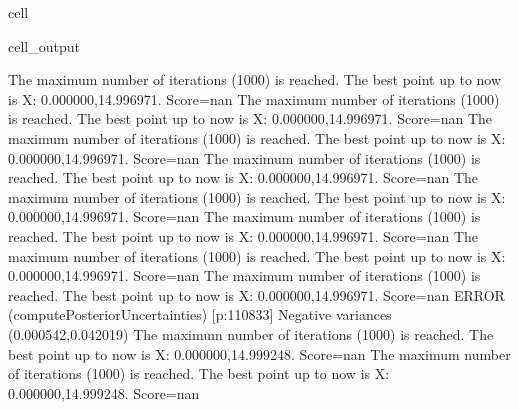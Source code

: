 \documentclass[letterpaper,10pt,english]{jupyterBook}
\begin{document}
\begin{sphinxuseclass}{cell}
\begin{sphinxVerbatimOutput}
\begin{sphinxuseclass}{cell_output}
\begin{sphinxVerbatim}[commandchars=\\\{\}]
The maximum number of iterations (1000) is reached. The best point up to now is X: \PYGZob{}0.000000,14.996971\PYGZcb{}. Score=\PYGZhy{}nan
The maximum number of iterations (1000) is reached. The best point up to now is X: \PYGZob{}0.000000,14.996971\PYGZcb{}. Score=\PYGZhy{}nan
The maximum number of iterations (1000) is reached. The best point up to now is X: \PYGZob{}0.000000,14.996971\PYGZcb{}. Score=\PYGZhy{}nan
The maximum number of iterations (1000) is reached. The best point up to now is X: \PYGZob{}0.000000,14.996971\PYGZcb{}. Score=\PYGZhy{}nan
The maximum number of iterations (1000) is reached. The best point up to now is X: \PYGZob{}0.000000,14.996971\PYGZcb{}. Score=\PYGZhy{}nan
The maximum number of iterations (1000) is reached. The best point up to now is X: \PYGZob{}0.000000,14.996971\PYGZcb{}. Score=\PYGZhy{}nan
The maximum number of iterations (1000) is reached. The best point up to now is X: \PYGZob{}0.000000,14.996971\PYGZcb{}. Score=\PYGZhy{}nan
The maximum number of iterations (1000) is reached. The best point up to now is X: \PYGZob{}0.000000,14.996971\PYGZcb{}. Score=\PYGZhy{}nan
ERROR (compute\PYGZus{}Posterior\PYGZus{}Uncertainties) [p:110833] Negative variances (\PYGZhy{}0.000542,0.042019)
The maximum number of iterations (1000) is reached. The best point up to now is X: \PYGZob{}0.000000,14.999248\PYGZcb{}. Score=\PYGZhy{}nan
The maximum number of iterations (1000) is reached. The best point up to now is X: \PYGZob{}0.000000,14.999248\PYGZcb{}. Score=\PYGZhy{}nan
\end{sphinxVerbatim}


\end{sphinxuseclass}
\end{sphinxVerbatimOutput}
\end{sphinxuseclass}
\end{document}
